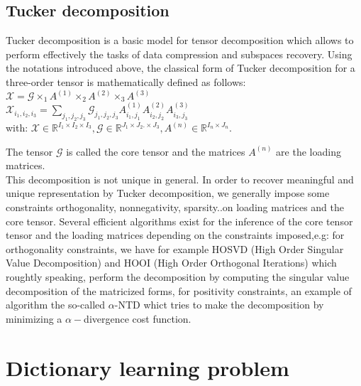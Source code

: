 \documentclass{article}
\def\X{\boldsymbol{{\mathscr X}}}
\def\G{\boldsymbol{{\mathscr G}}}
\begin{document}
 \subsection{Tucker decomposition}
 Tucker decomposition is a basic model for tensor decomposition which allows to perform effectively the tasks of data compression and subspaces recovery. Using the notations introduced above, the classical form of Tucker decomposition for a three-order tensor is mathematically defined as follows:\\
 $\X=\G\times_{1}A^{(1)}\times_{2}A^{(2)}\times_{3}A^{(3)}$\\
 $\X_{i_{1},i_{2},i_{3}}=\sum_{j_{1},j_{2},j_{3}}\G_{j_{1},j_{2},j_{3}}A^{(1)}_{i_{1},j_{1}}A^{(2)}_{i_{2},j_{2}}A^{(3)}_{i_{3},j_{3}}$\\
 with: $\X \in \mathbb{R}^{I_{1}\times I_{2} \times I_{3}},\G \in \mathbb{R}^{J_{1}\times J_{2}.\times J_{3}},A^{(n)}\in \mathbb{R}^{I_{n}\times J_{n}}$.
 
 The tensor $\G$ is called the core tensor and the matrices $A^{(n)}$ are the loading matrices.\\
 This decomposition is not unique in general. In order to recover meaningful and unique representation  by Tucker decomposition, we generally impose some constraints orthogonality, nonnegativity, sparsity..on loading matrices and the core tensor. Several efficient algorithms exist for the inference of the core tensor tensor and the loading matrices depending on the constraints imposed,e.g: for orthogonality constraints, we have for example HOSVD (High Order Singular Value Decomposition) and HOOI (High Order Orthogonal Iterations) which roughtly speaking, perform the decomposition by computing the singular value decomposition of the matricized forms, for positivity constraints, an example of algorithm the so-called $\alpha$-NTD whict tries to make the decomposition by minimizing a $\alpha-$divergence cost function.
 \section{Dictionary learning problem}
 
\end{document}
